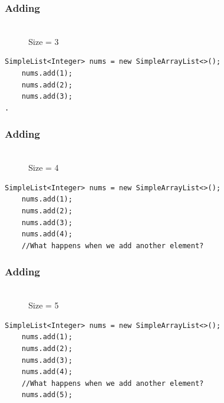 \documentclass{beamer}
\begin{document}
\begin{frame}[fragile]
    \frametitle{Adding}
    \begin{figure}
        \centering
        \\Size = 3
    \end{figure}
    \vfill
    \begin{lstlisting}[basicstyle=\small]
    SimpleList<Integer> nums = new SimpleArrayList<>();
    nums.add(1);
    nums.add(2);
    nums.add(3);
.
    \end{lstlisting}
\end{frame}

\begin{frame}[fragile]
    \frametitle{Adding}
    \begin{figure}
        \centering
        \\Size = 4
    \end{figure}
    \vfill
    \begin{lstlisting}[basicstyle=\small]
    SimpleList<Integer> nums = new SimpleArrayList<>();
    nums.add(1);
    nums.add(2);
    nums.add(3);
    nums.add(4);
    //What happens when we add another element?
    \end{lstlisting}
\end{frame}

\begin{frame}[fragile]
    \frametitle{Adding}
    \begin{figure}
        \centering
        \\Size = 5
    \end{figure}
    \vfill
    \begin{lstlisting}[basicstyle=\small]
    SimpleList<Integer> nums = new SimpleArrayList<>();
    nums.add(1);
    nums.add(2);
    nums.add(3);
    nums.add(4);
    //What happens when we add another element?
    nums.add(5);
    \end{lstlisting}
\end{frame}
\end{document}
